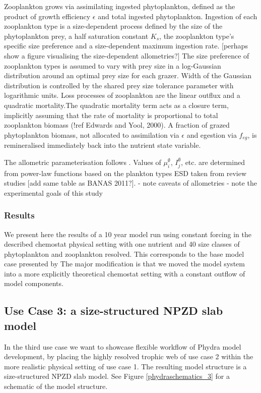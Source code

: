 \documentclass[template.tex]{subfiles}
\begin{document}
Zooplankton grows via assimilating ingested phytoplankton, defined as the product of growth efficiency $\epsilon$ and total ingested phytoplankton. Ingestion of each zooplankton type is a size-dependent process defined by the size of the phytoplankton prey, a half saturation constant $K_s$, the zooplankton type's specific size preference and a size-dependent maximum ingestion rate. [perhaps show a figure visualising the size-dependent allometries?]
The size preference of zooplankton types is assumed to vary with prey size in a log-Gaussian distribution around an optimal prey size for each grazer.
Width of the Gaussian distribution is controlled by the shared prey size tolerance parameter with logarithmic units.
Loss processes of zooplankton are the linear outflux and a quadratic mortality.The quadratic mortality term acts as a closure term, implicitly assuming that the rate of mortality is proportional to total zooplankton biomass (!ref Edwards and Yool, 2000). 
A fraction of grazed phytoplankton biomass, not allocated to assimilation via $\epsilon$ and egestion via $f_{eg}$, is remineralised immediately back into the nutrient state variable.

The allometric parameterisation follows \cite{Banas2011b}. Values of $\mu_i^\emptyset$, $I_j^\emptyset$, etc. are determined from power-law functions based on the plankton types ESD taken from review studies [add same table as BANAS 2011?].
- note caveats of allometries
- note the experimental goals of this study


\subsubsection{Results}

We present here the results of a 10 year model run using constant forcing in the described chemostat physical setting with one nutrient and 40 size classes of phytoplankton and zooplankton resolved. This corresponds to the base model case presented by \cite{Banas2011b} The major modification is that we moved the model system into a more explicitly theoretical chemostat setting with a constant outflow of model components. 


\subsection{Use Case 3: a size-structured NPZD slab model}
In the third use case we want to showcase flexible workflow of Phydra model development, by placing the highly resolved trophic web of use case 2 within the more realistic physical setting of use case 1. The resulting model structure is a size-structured NPZD slab model. See Figure \ref{phydraschematics_3} for a schematic of the model structure. \\
\end{document}
